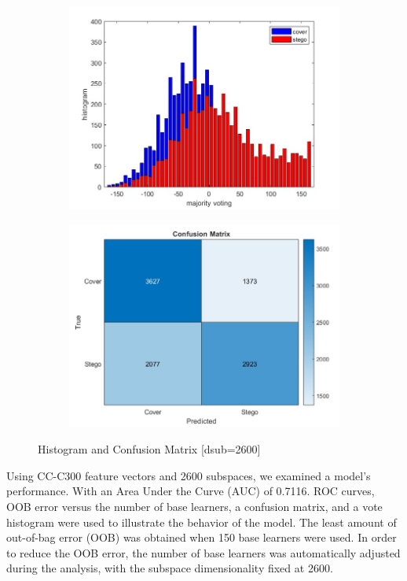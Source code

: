 \begin{figure}[H]
    \begin{subfigure}[b]{0.5\textwidth}
        \includegraphics[width=\textwidth]{img/2600/histo2600.jpg}
    \end{subfigure}
    \hfill
    \begin{subfigure}[b]{0.5\textwidth}
        \includegraphics[width=\textwidth]{img/2600/consuse2600.jpg}
    \end{subfigure}
    \caption{Histogram and Confusion Matrix [dsub=2600]}
\end{figure}
Using CC-C300 feature vectors and 2600 subspaces, we examined a model's performance. With an Area Under the Curve (AUC) of 0.7116. ROC curves, OOB error versus the number of base learners, a confusion matrix, and a vote histogram were used to illustrate the behavior of the model. The least amount of out-of-bag error (OOB) was obtained when 150 base learners were used. In order to reduce the OOB error, the number of base learners was automatically adjusted during the analysis, with the subspace dimensionality fixed at 2600.
\clearpage


